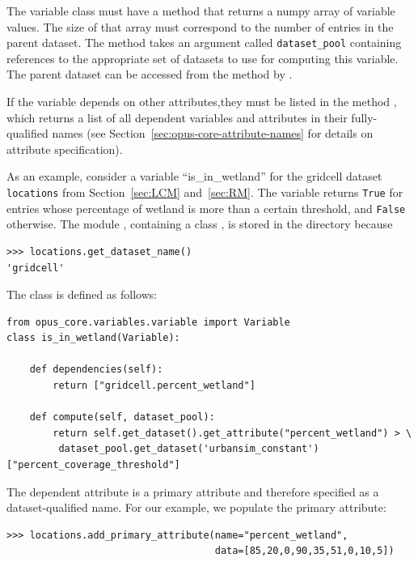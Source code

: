 The variable \variablesindex class must have a method  
that returns a numpy array of
variable \variablesindex values. The size of that array must correspond to the number of entries in the parent
dataset. \datasetindex The  method takes an argument called
\verb|dataset_pool| containing references to the appropriate set of datasets to
use for computing this variable. The parent dataset \datasetindex can be
accessed from the  method by .

If the variable depends on other attributes,they must be listed in the method
, which returns a list of all dependent variables and
attributes in their fully-qualified names (see
Section~\ref{sec:opus-core-attribute-names} for details on attribute
specification).

As an example, consider a variable ``is_in_wetland'' for the gridcell dataset
\verb|locations| from Section~\ref{sec:LCM} and~\ref{sec:RM}. The variable
returns \verb|True| for entries whose percentage of wetland is more than a certain
threshold, and \verb|False| otherwise. The module ,
containing a class , is stored in the directory
 because
\begin{verbatim}
>>> locations.get_dataset_name()
'gridcell'
\end{verbatim}

The class is defined as follows:
\variablesindex
\begin{verbatim}
from opus_core.variables.variable import Variable
class is_in_wetland(Variable):

    def dependencies(self):
        return ["gridcell.percent_wetland"]

    def compute(self, dataset_pool):
        return self.get_dataset().get_attribute("percent_wetland") > \
         dataset_pool.get_dataset('urbansim_constant')["percent_coverage_threshold"]

\end{verbatim}
The dependent attribute is a primary attribute and therefore specified as
a dataset-qualified name.  For our example, we populate the primary attribute:
\begin{verbatim}
>>> locations.add_primary_attribute(name="percent_wetland",
                                    data=[85,20,0,90,35,51,0,10,5])
\end{verbatim}

